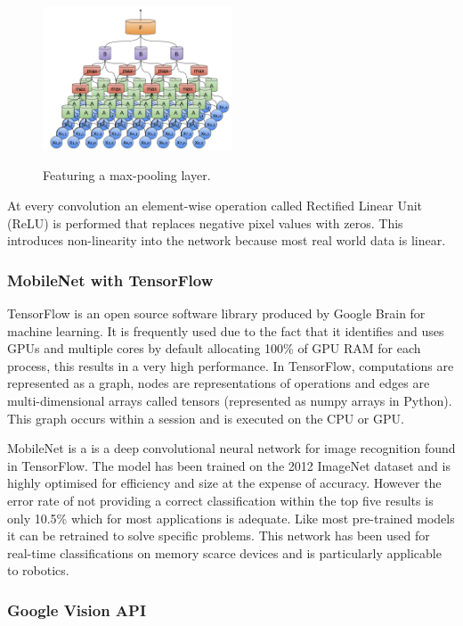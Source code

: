 \documentclass{mproj}
\begin{document}
\begin{figure}[h]
  \caption{Featuring a max-pooling layer.}
  \centering
  \includegraphics[width=0.5\textwidth]{images/conv_max.png}
  \label{fig:Basic CNN with Max-pooling diagram}
\end{figure}

At every convolution an element-wise operation called Rectified Linear Unit (ReLU) is performed that replaces negative pixel values with zeros. This introduces non-linearity into the network because most real world data is linear.


\subsubsection{MobileNet with TensorFlow}
TensorFlow is an open source software library produced by Google Brain for machine learning\cite{tensor}. It is frequently used due to the fact that it identifies and uses GPUs and multiple cores by default allocating 100\% of GPU RAM for each process, this results in a very high performance. In TensorFlow, computations are represented as a graph, nodes are representations of operations and edges are multi-dimensional arrays called tensors (represented as numpy arrays in Python). This graph occurs within a session and is executed on the CPU or GPU. 
  
MobileNet is a is a deep convolutional neural network for image recognition found in TensorFlow\cite{HowardZCKWWAA17}. The model has been trained on the 2012 ImageNet dataset and is highly optimised for efficiency and size at the expense of accuracy. However the error rate of not providing a correct classification within the top five results is only 10.5\% which for most applications is adequate. Like most pre-trained models it can be retrained to solve specific problems. This network has been used for real-time classifications on memory scarce devices and is particularly applicable to robotics.
  
  \subsubsection{Google Vision API}
  
\end{document}
